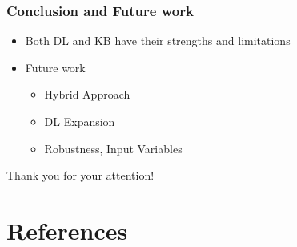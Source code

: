 \begin{frame}
    \frametitle{Conclusion and Future work}
    \begin{itemize}
        \item Both DL and KB have their strengths and limitations
        \item Future work
        \begin{itemize}
            \item Hybrid Approach
            \item DL Expansion
            \item Robustness, Input Variables
        \end{itemize}
    \end{itemize}
\end{frame}


\begin{frame}
    \begin{center}
        \Huge{Thank you for your attention!}
    \end{center}
\end{frame}

\section{References}

